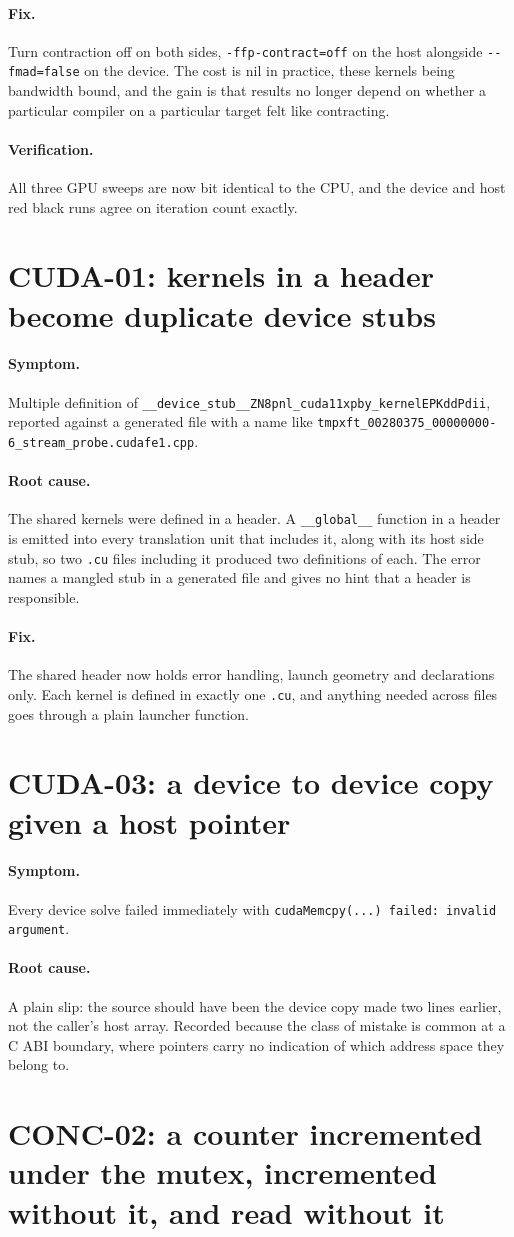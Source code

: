 \documentclass[11pt,a4paper]{report}
\newcommand{\symptom}[1]{\paragraph{Symptom.}#1}
\newcommand{\rootcause}[1]{\paragraph{Root cause.}#1}
\newcommand{\fix}[1]{\paragraph{Fix.}#1}
\newcommand{\verification}[1]{\paragraph{Verification.}#1}
\begin{document}
\fix{Turn contraction off on both sides, \texttt{-ffp-contract=off} on the host
alongside \texttt{-{}-fmad=false} on the device. The cost is nil in practice, these
kernels being bandwidth bound, and the gain is that results no longer depend on
whether a particular compiler on a particular target felt like contracting.}

\verification{All three GPU sweeps are now bit identical to the CPU, and the
device and host red black runs agree on iteration count exactly.}

\section{CUDA-01: kernels in a header become duplicate device stubs}

\symptom{Multiple definition of
\texttt{\_\_device\_stub\_\_ZN8pnl\_cuda11xpby\_kernelEPKddPdii}, reported
against a generated file with a name like
\texttt{tmpxft\_00280375\_00000000-6\_stream\_probe.cudafe1.cpp}.}

\rootcause{The shared kernels were defined in a header. A \texttt{\_\_global\_\_}
function in a header is emitted into every translation unit that includes it,
along with its host side stub, so two \texttt{.cu} files including it produced
two definitions of each. The error names a mangled stub in a generated file and
gives no hint that a header is responsible.}

\fix{The shared header now holds error handling, launch geometry and
declarations only. Each kernel is defined in exactly one \texttt{.cu}, and
anything needed across files goes through a plain launcher function.}

\section{CUDA-03: a device to device copy given a host pointer}

\symptom{Every device solve failed immediately with
\texttt{cudaMemcpy(...) failed: invalid argument}.}

\rootcause{A plain slip: the source should have been the device copy made two
lines earlier, not the caller's host array. Recorded because the class of mistake
is common at a C ABI boundary, where pointers carry no indication of which
address space they belong to.}

\section{CONC-02: a counter incremented under the mutex, incremented without it, and read without it}
\end{document}

